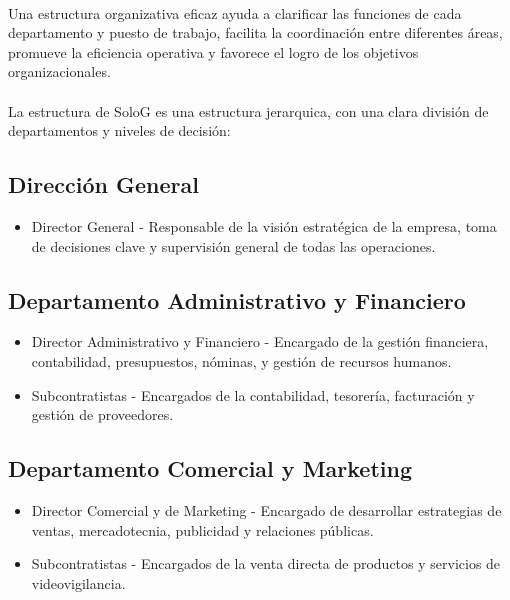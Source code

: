 \documentclass{report}
\begin{document}
          \paragraph*{}
          {
            Una estructura organizativa eficaz ayuda a clarificar las funciones de cada departamento y puesto de trabajo, facilita la coordinación entre diferentes áreas, promueve la eficiencia operativa y favorece el logro de los objetivos organizacionales.
          }
          \paragraph*{}
          {
            La estructura de SoloG es una estructura jerarquica, con una clara división de departamentos y niveles de decisión:
          }
          \subsection{Dirección General}
            \begin{itemize}
            \item Director General - Responsable de la visión estratégica de la empresa, toma de decisiones clave y supervisión general de todas las operaciones.
            \end{itemize}
          \subsection{Departamento Administrativo y Financiero}
            \begin{itemize}
            \item Director Administrativo y Financiero - Encargado de la gestión financiera, contabilidad, presupuestos, nóminas, y gestión de recursos humanos.
            \item Subcontratistas - Encargados de la contabilidad, tesorería, facturación y gestión de proveedores.
            \end{itemize}
          \subsection{Departamento Comercial y Marketing}
            \begin{itemize}
            \item Director Comercial y de Marketing - Encargado de desarrollar estrategias de ventas, mercadotecnia, publicidad y relaciones públicas.
            \item Subcontratistas - Encargados de la venta directa de productos y servicios de videovigilancia.
            \end{itemize}
\end{document}
